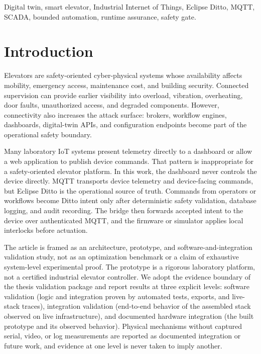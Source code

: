 \documentclass[journal]{IEEEtran}
\begin{document}
\begin{IEEEkeywords}
Digital twin, smart elevator, Industrial Internet of Things, Eclipse Ditto, MQTT, SCADA, bounded automation, runtime assurance, safety gate.
\end{IEEEkeywords}

\section{Introduction}

Elevators are safety-oriented cyber-physical systems whose availability affects mobility, emergency access, maintenance cost, and building security. Connected supervision can provide earlier visibility into overload, vibration, overheating, door faults, unauthorized access, and degraded components. However, connectivity also increases the attack surface: brokers, workflow engines, dashboards, digital-twin APIs, and configuration endpoints become part of the operational safety boundary.

Many laboratory IoT systems present telemetry directly to a dashboard or allow a web application to publish device commands. That pattern is inappropriate for a safety-oriented elevator platform. In this work, the dashboard never controls the device directly. MQTT transports device telemetry and device-facing commands, but Eclipse Ditto is the operational source of truth. Commands from operators or workflows become Ditto intent only after deterministic safety validation, database logging, and audit recording. The bridge then forwards accepted intent to the device over authenticated MQTT, and the firmware or simulator applies local interlocks before actuation.

The article is framed as an architecture, prototype, and software-and-integration validation study, not as an optimization benchmark or a claim of exhaustive system-level experimental proof. The prototype is a rigorous laboratory platform, not a certified industrial elevator controller. We adopt the evidence boundary of the thesis validation package and report results at three explicit levels: software validation (logic and integration proven by automated tests, exports, and live-stack traces), integration validation (end-to-end behavior of the assembled stack observed on live infrastructure), and documented hardware integration (the built prototype and its observed behavior). Physical mechanisms without captured serial, video, or log measurements are reported as documented integration or future work, and evidence at one level is never taken to imply another.
\end{document}

